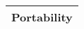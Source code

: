 \begin{tabular}{|l|l|l|l|l|}
	\hline
	\multicolumn{5}{c}{\textbf{Portability}}                                                                                                                                                                                                                                                                                                                                                                                                                                                                                                                                                                                                                                                                                                                                        \\ 
	\hline
\end{tabular}



